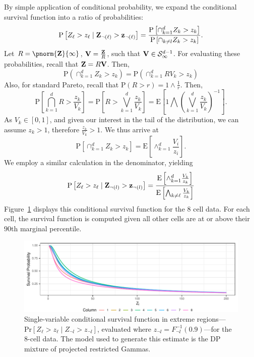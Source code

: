 By simple application of conditional probability, we expand the conditional survival function into
  a ratio of probabilities:
  \begin{equation}
    \label{eqn:condsurv1d}
    \text{P}\left[Z_{\ell} > z_{\ell}\mid {\bf Z}_{\neg(\ell)} > {\bf z}_{\neg(\ell)}\right] =
      \frac{\text{P}\left[\cap_{k = 1}^d Z_k > z_k\right]}{\text{P}\left[\cap_{k \neq l} Z_k > z_k\right]}.
  \end{equation}
  Let $R = \pnorm{{\bf Z}}{\infty}$, ${\bf V} = \frac{{\bf Z}}{R}$, such that ${\bf V}\in \mathcal{S}_{\infty}^{d-1}$.
  For evaluating these probabilities, recall that ${\bf Z} = R{\bf V}$.  Then,
  \begin{equation}
    \text{P}\left(\cap_{k = 1}^d Z_k > z_k\right) = \text{P}\left(\cap_{k = 1}^d RV_k > z_k\right)
  \end{equation}
  Also, for standard Pareto, recall that $\text{P}(R > r) = 1\wedge\frac{1}{r}$.  Then,
  \begin{equation}
    \text{P}\left[\bigcap_{k = 1}^d R > \frac{z_k}{V_k}\right] =
      \text{P}\left[R  > \bigvee_{k=1}^d\frac{z_k}{V_k}\right] =
      \text{E}\left[1 \bigwedge \left(\bigvee_{k = 1}^d\frac{z_k}{V_k}\right)^{-1}\right].
  \end{equation}
  As $V_k \in [0,1]$, and given our interest in the tail of the distribution, we can assume
  $z_k > 1$, therefore $\frac{z_k}{V_k} > 1$.  We thus arrive at
  \begin{equation}
    \text{P}\left[\cap_{k = 1}^d Z_k > z_k\right] = \text{E}\left[\wedge_{k = 1}^d\frac{V_i}{z_i}\right].
  \end{equation}
  We employ a similar calculation in the denominator, yielding
  \begin{equation}
    \text{P}\left[Z_{\ell} > z_{\ell}\mid {\bf Z}_{\neg(l)} > {\bf z}_{\neg(l)}\right] =
      \frac{\text{E}\left[\wedge_{k = 1}^d \frac{V_k}{z_k}\right]}{\text{E}\left[\bigwedge_{k \neq \ell}\frac{V_k}{z_k}\right]}
  \end{equation}
  Figure~\ref{fig:condsurv1d} displays this conditional survival function for the 8 cell data. For each
  cell, the survival function is computed given all other cells are at or above their $90$th marginal
  percentile.

\begin{figure}[b]
  \caption{
    Single-variable conditional survival function in extreme
    regions---$\text{Pr}[Z_{\ell} > z_{\ell}\mid Z_{\neg l} > z_{\neg l}]$,
    evaluated where $z_{\neg l} = F_{\neg l}^{-1}(0.9)$---for the 8-cell data.  The model used to
    generate this estimate is the DP mixture of projected restricted Gammas.\label{fig:condsurv1d}
    }
  \centering
  \includegraphics[width = 5in]{./images/condsurv_1d}
\end{figure}

